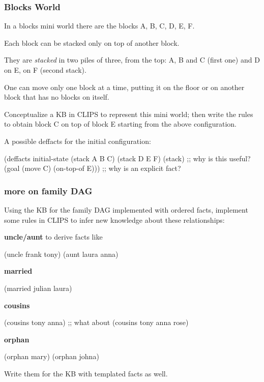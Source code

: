 \documentclass[xcolor={usenames,dvipsnames,svgnames}, compress]{beamer}
\begin{document}
\begin{frame}[fragile]
  \frametitle{Blocks World}
  In a blocks mini world there are the blocks A, B, C, D, E, F.\par
  Each block can be stacked only on top of another block.\par
  
  They are \emph{stacked} in two piles of three, from the top: A, B
  and C (first one) and D on E, on F (second stack).\par\bigskip

  One can move only one block at a time, putting it on the floor or on
  another block that has no blocks on itself.\par
  Conceptualize a KB in CLIPS to represent this mini world; then write
  the rules to obtain block C on top of block E starting from the
  above configuration.\bigskip

  A possible deffacts for the initial configuration:
  \begin{clips-code}[numbers=none]
    (deffacts initial-state
       (stack A B C)
       (stack D E F)
       (stack) ;; why is this useful?
       (goal (move C) (on-top-of E))) ;; why is an explicit fact?
  \end{clips-code}
\end{frame}


\begin{frame}[fragile]
  \frametitle{more on family DAG}

  Using the KB for the family DAG implemented with ordered facts,
  implement some rules in CLIPS to infer new knowledge about these
  relationships:\par\bigskip
  \textbf{uncle/aunt} to derive facts like
    \begin{clips-code}[numbers=none]
      (uncle frank tony) (aunt laura anna)
    \end{clips-code}
  \textbf{married}
    \begin{clips-code}[numbers=none]
      (married julian laura)
    \end{clips-code}
  \textbf{cousins}
    \begin{clips-code}[numbers=none]
      (cousins tony anna)
      ;; what about (cousins tony anna rose)
    \end{clips-code}
  \textbf{orphan}
    \begin{clips-code}[numbers=none]
      (orphan mary)    (orphan johna)
    \end{clips-code}
 \bigskip

 Write them for the KB with templated facts as well.   
\end{frame}
\end{document}
